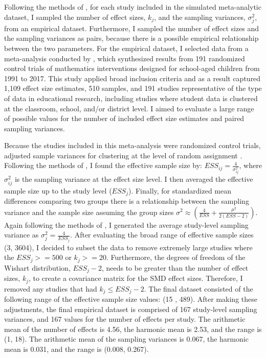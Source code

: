 Following the methods of \textcite{vembye2023}, for each study included in the simulated meta-analytic dataset, I sampled the number of effect sizes, $k_j$, and the sampling variances, $\sigma_j^2$, from an empirical dataset. Furthermore, I sampled the number of effect sizes and the sampling variances as pairs, because there is a possible empirical relationship between the two parameters. For the empirical dataset, I selected data from a meta-analysis conducted by \textcite{WilliamsRyan2022HiMI}, which synthesized results from 191 randomized control trials of mathematics interventions designed for school-aged children from 1991 to 2017. This study applied broad inclusion criteria and as a result captured 1,109 effect size estimates, 510 samples, and 191 studies representative of the type of data in educational research, including studies where student data is clustered at the classroom, school, and/or district level. I aimed to evaluate a large range of possible values for the number of included effect size estimates and paired sampling variances. 

Because the studies included in this meta-analysis were randomized control trials, \textcite{WilliamsRyan2022HiMI} adjusted sample variances for clustering at the level of random assignment \autocite{hedgesEffectSizesClusterRandomized2007, hedges2013}. Following the methods of \textcite{vembye2023}, I found the effective sample size by: $ESS_{ij} = \frac{4}{ \sigma_{ij}^2 }$, where $\sigma_{ij}^2 $ is the sampling variance at the effect size level.  I then averaged the effective sample size up to the study level ($ESS_j$). Finally, for standardized mean differences comparing two groups there is a relationship between the sampling variance and the sample size assuming the group sizes $\sigma^2 \approx \left( \frac{4}{ESS} + \frac{\mu^2}{2(ESS -2)} \right)$\autocite{valentine2010}. Again following the methods of \textcite{vembye2023}, I generated the average study-level sampling variance as $\sigma_j^2 = \frac{4}{ESS_j}$. After evaluating the broad range of effective sample sizes (3, 3604), I decided to subset the data to remove extremely large studies where the $ESS_j >= 500$ or $k_j >= 20$. Furthermore, the degrees of freedom of the Wishart distribution, $ESS_j-2$, needs to be greater than the number of effect sizes, $k_j$, to create a covariance matrix for the SMD effect sizes. Therefore, I removed any studies that had $k_j \leq ESS_j - 2$. The final dataset consisted of the following range of the effective sample size values: (15 , 489). After making these adjustments, the final empirical dataset is comprised of 167 study-level sampling variances, and  167 values for the number of effects per study. The arithmetic mean of the number of effects is 4.56, the harmonic mean is 2.53, and the range is (1, 18). The arithmetic mean of the sampling variances is 0.067, the harmonic mean is 0.031, and the range is (0.008, 0.267). 

